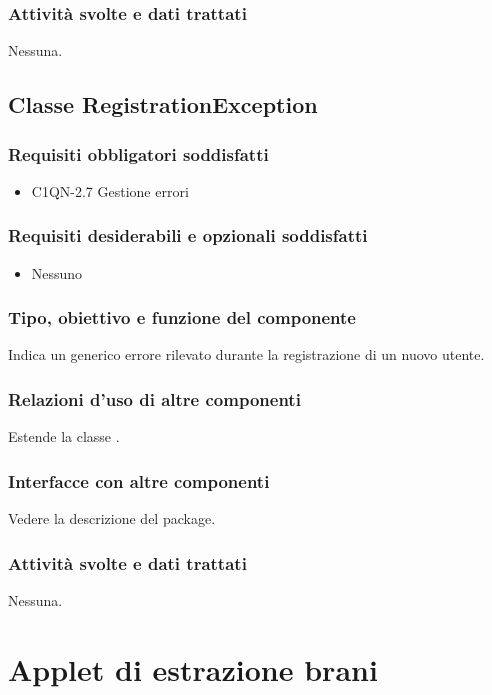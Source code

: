\subsubsection*{Attivit\`a svolte e dati trattati}
Nessuna.

\subsection{Classe RegistrationException}
\subsubsection*{Requisiti obbligatori soddisfatti}
\begin{itemize}
	\item C1QN-2.7 Gestione errori
\end{itemize}
\subsubsection*{Requisiti desiderabili e opzionali soddisfatti}
\begin{itemize}
    \item Nessuno
\end{itemize}
\subsubsection*{Tipo, obiettivo e funzione del componente}
Indica un generico errore rilevato durante la registrazione di un nuovo utente.
\subsubsection*{Relazioni d'uso di altre componenti}
Estende la classe .
\subsubsection*{Interfacce con altre componenti}
Vedere la descrizione del package.
\subsubsection*{Attivit\`a svolte e dati trattati}
Nessuna.


\section{Applet di estrazione brani}

